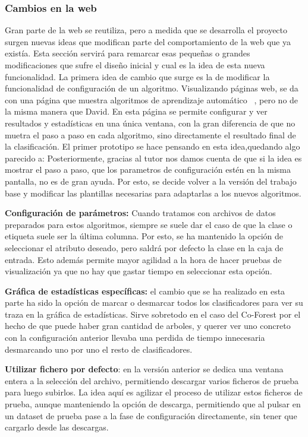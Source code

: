 \subsubsection{Cambios en la web}
Gran parte de la web se reutiliza, pero a medida que se desarrolla el proyecto surgen nuevas ideas que modifican parte del comportamiento de la web que ya existía. Esta sección servirá para remarcar esas pequeñas o grandes modificaciones que sufre el diseño inicial y cual es la idea de esta nueva funcionalidad. 
La primera idea de cambio que surge es la de modificar la funcionalidad de configuración de un algoritmo. Visualizando páginas web, se da con una página que muestra algoritmos de aprendizaje automático~ \cite{web:ml-visualizer}, pero no de la misma manera que David. En esta página se permite configurar y ver resultados y estadísticas en una única ventana, con la gran diferencia de que no muetra el paso a paso en cada algoritmo, sino directamente el resultado final de la clasificación.
El primer prototipo se hace pensando en esta idea,quedando algo parecido a:
Posteriormente, gracias al tutor nos damos cuenta de que si la idea es mostrar el paso a paso, que los parametros de configuración estén en la misma pantalla, no es de gran ayuda. Por esto, se decide volver a la versión del trabajo base y modificar las plantillas necesarias para adaptarlas a los nuevos algoritmos.

\textbf{Configuración de parámetros:} Cuando tratamos con archivos de datos preparados para estos algoritmos, siempre se suele dar el caso de que la clase o etiqueta suele ser la última columna. Por esto, se ha mantenido la opción de seleccionar el atributo deseado, pero saldrá por defecto la clase en la caja de entrada. Esto además permite mayor agilidad a la hora de hacer pruebas de visualización ya que no hay que gastar tiempo en seleccionar esta opción.

\textbf{Gráfica de estadísticas específicas:} el cambio que se ha realizado en esta parte ha sido la opción de marcar o desmarcar todos los clasificadores para ver su traza en la gráfica de estadísticas. Sirve sobretodo en el caso del Co-Forest por el hecho de que puede haber gran cantidad de arboles, y querer ver uno concreto con la configuración anterior llevaba una perdida de tiempo innecesaria desmarcando uno por uno el resto de clasificadores.

\textbf{Utilizar fichero por defecto}: en la versión anterior se dedica una ventana entera a la selección del archivo, permitiendo descargar varios ficheros de prueba para luego subirlos. La idea aquí es agilizar el proceso de utilizar estos ficheros de prueba, aunque manteniendo la opción de descarga, permitiendo que al pulsar en un dataset de prueba pase a la fase de configuración directamente, sin tener que cargarlo desde las descargas.

